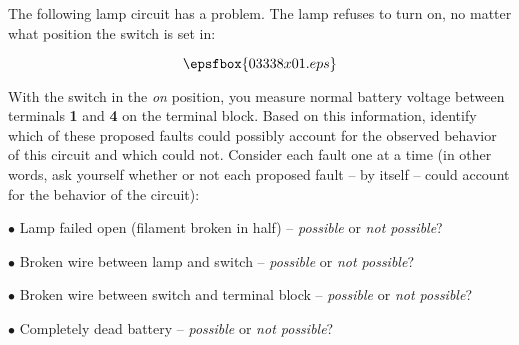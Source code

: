 

The following lamp circuit has a problem.  The lamp refuses to turn on, no matter what position the switch is set in:

$$\epsfbox{03338x01.eps}$$

With the switch in the {\it on} position, you measure normal battery voltage between terminals {\bf 1} and {\bf 4} on the terminal block.  Based on this information, identify which of these proposed faults could possibly account for the observed behavior of this circuit and which could not.  Consider each fault one at a time (in other words, ask yourself whether or not each proposed fault -- by itself -- could account for the behavior of the circuit):

\medskip
\item{$\bullet$} Lamp failed open (filament broken in half) -- {\it possible} or {\it not possible}?
\item{$\bullet$} Broken wire between lamp and switch -- {\it possible} or {\it not possible}?
\item{$\bullet$} Broken wire between switch and terminal block -- {\it possible} or {\it not possible}?
\item{$\bullet$} Completely dead battery -- {\it possible} or {\it not possible}?
\medskip







